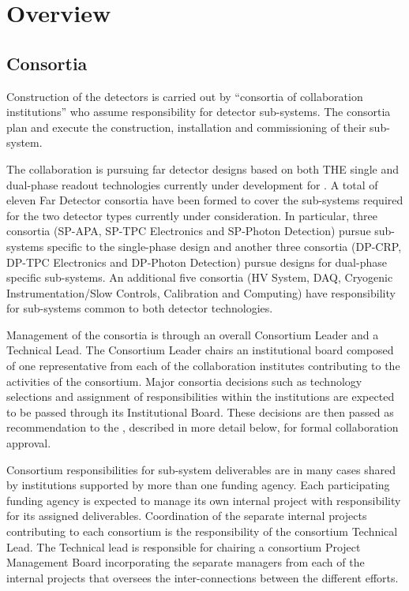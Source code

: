 \chapter{Overview}
\label{vl:tc-overview}

\section{Consortia}
\label{sec:consortia}

Construction of the  detectors is carried out by
``consortia of collaboration institutions'' who assume responsibility
for detector sub-systems.  The consortia plan and
execute the construction, installation and commissioning of their
sub-system.

The  collaboration is pursuing far detector designs based on both
THE single and dual-phase readout technologies currently under
development for . A total
of eleven Far Detector consortia have been formed to cover the
sub-systems required for the two detector types currently under
consideration.  In particular, three consortia (SP-APA, SP-TPC
Electronics and SP-Photon Detection) pursue sub-systems specific to
the single-phase design and another three consortia (DP-CRP, DP-TPC
Electronics and DP-Photon Detection) pursue designs for dual-phase
specific sub-systems.  An additional five consortia (HV System, DAQ,
Cryogenic Instrumentation/Slow Controls, Calibration and Computing)
have responsibility for sub-systems common to both detector
technologies.

Management of the consortia is through an overall Consortium Leader
and a Technical Lead.  The Consortium Leader chairs an institutional
board composed of one representative from each of the collaboration
institutes contributing to the activities of the consortium.  Major
consortia decisions such as technology selections and assignment of
responsibilities within the institutions are expected to be passed
through its Institutional Board.  These decisions are then passed as
recommendation to the  , described in more detail
below, for formal collaboration approval.

Consortium responsibilities for sub-system deliverables are in many
cases shared by institutions supported by more than one funding
agency.  Each participating funding agency is expected to manage its
own internal project with responsibility for its assigned
deliverables.  Coordination of the separate internal projects
contributing to each consortium is the responsibility of the
consortium Technical Lead.  The Technical lead is responsible for
chairing a consortium Project Management Board incorporating the
separate managers from each of the internal projects that oversees the
inter-connections between the different efforts.

